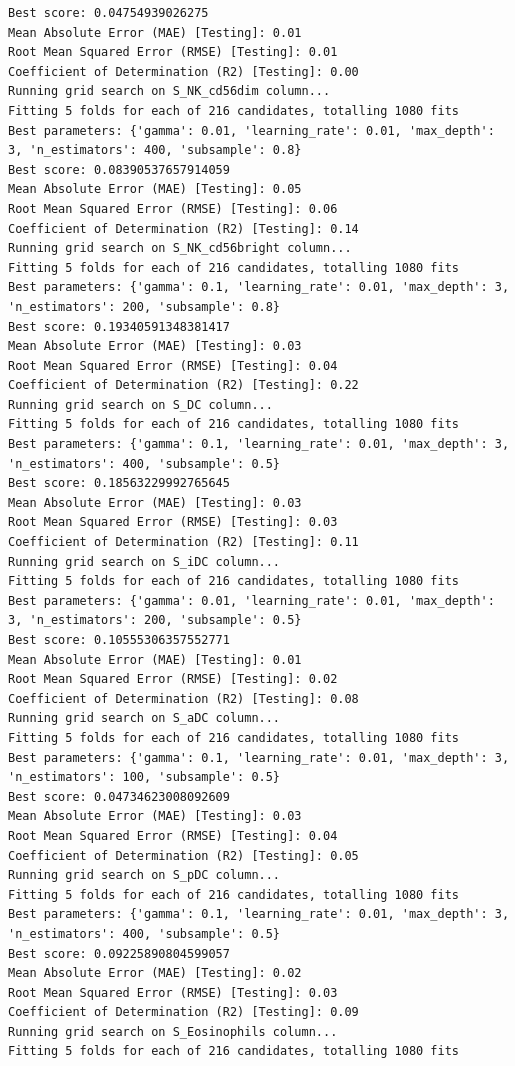 \documentclass[
  letterpaper,
  DIV=11,
  numbers=noendperiod]{scrartcl}
\begin{document}
\begin{verbatim}
Best score: 0.04754939026275
Mean Absolute Error (MAE) [Testing]: 0.01
Root Mean Squared Error (RMSE) [Testing]: 0.01
Coefficient of Determination (R2) [Testing]: 0.00
Running grid search on S_NK_cd56dim column...
Fitting 5 folds for each of 216 candidates, totalling 1080 fits
Best parameters: {'gamma': 0.01, 'learning_rate': 0.01, 'max_depth': 3, 'n_estimators': 400, 'subsample': 0.8}
Best score: 0.08390537657914059
Mean Absolute Error (MAE) [Testing]: 0.05
Root Mean Squared Error (RMSE) [Testing]: 0.06
Coefficient of Determination (R2) [Testing]: 0.14
Running grid search on S_NK_cd56bright column...
Fitting 5 folds for each of 216 candidates, totalling 1080 fits
Best parameters: {'gamma': 0.1, 'learning_rate': 0.01, 'max_depth': 3, 'n_estimators': 200, 'subsample': 0.8}
Best score: 0.19340591348381417
Mean Absolute Error (MAE) [Testing]: 0.03
Root Mean Squared Error (RMSE) [Testing]: 0.04
Coefficient of Determination (R2) [Testing]: 0.22
Running grid search on S_DC column...
Fitting 5 folds for each of 216 candidates, totalling 1080 fits
Best parameters: {'gamma': 0.1, 'learning_rate': 0.01, 'max_depth': 3, 'n_estimators': 400, 'subsample': 0.5}
Best score: 0.18563229992765645
Mean Absolute Error (MAE) [Testing]: 0.03
Root Mean Squared Error (RMSE) [Testing]: 0.03
Coefficient of Determination (R2) [Testing]: 0.11
Running grid search on S_iDC column...
Fitting 5 folds for each of 216 candidates, totalling 1080 fits
Best parameters: {'gamma': 0.01, 'learning_rate': 0.01, 'max_depth': 3, 'n_estimators': 200, 'subsample': 0.5}
Best score: 0.10555306357552771
Mean Absolute Error (MAE) [Testing]: 0.01
Root Mean Squared Error (RMSE) [Testing]: 0.02
Coefficient of Determination (R2) [Testing]: 0.08
Running grid search on S_aDC column...
Fitting 5 folds for each of 216 candidates, totalling 1080 fits
Best parameters: {'gamma': 0.1, 'learning_rate': 0.01, 'max_depth': 3, 'n_estimators': 100, 'subsample': 0.5}
Best score: 0.04734623008092609
Mean Absolute Error (MAE) [Testing]: 0.03
Root Mean Squared Error (RMSE) [Testing]: 0.04
Coefficient of Determination (R2) [Testing]: 0.05
Running grid search on S_pDC column...
Fitting 5 folds for each of 216 candidates, totalling 1080 fits
Best parameters: {'gamma': 0.1, 'learning_rate': 0.01, 'max_depth': 3, 'n_estimators': 400, 'subsample': 0.5}
Best score: 0.09225890804599057
Mean Absolute Error (MAE) [Testing]: 0.02
Root Mean Squared Error (RMSE) [Testing]: 0.03
Coefficient of Determination (R2) [Testing]: 0.09
Running grid search on S_Eosinophils column...
Fitting 5 folds for each of 216 candidates, totalling 1080 fits

\end{verbatim}
\end{document}
